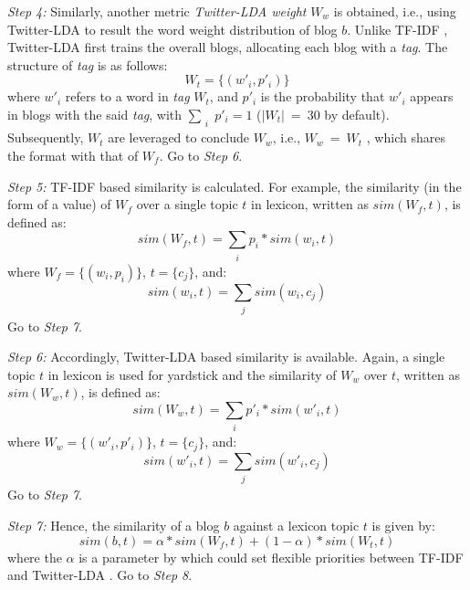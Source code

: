 \textit{Step 4:} Similarly, another metric \textit{Twitter-LDA weight} $W_w$ is obtained, i.e., using Twitter-LDA  to result the word weight distribution of blog $b$.
Unlike TF-IDF , Twitter-LDA  first trains the overall blogs, allocating each blog with a \textit{tag}.
%
The structure of \textit{tag} is as follows:
\begin{equation}
\label{eq:tw-tag}
W_t = \{(w'_i, p'_i)\}
\end{equation}
where $w'_i$ refers to a word in \textit{tag} $W_t$, and $p'_i$ is the probability that $w'_i$ appears in blogs with the said \textit{tag}, with $\sum_{\substack{i}} p'_i = 1$ ($|W_t|\ =\ 30$ by default).
%
Subsequently, $W_t$ are leveraged to conclude $W_w$, i.e., $W_w\ =\ W_t$ , which shares the format with that of $W_f$.
Go to \textit{Step 6}.

\textit{Step 5:} TF-IDF  based similarity is calculated.
For example, the similarity (in the form of a value) of $W_f$ over a single topic $t$ in lexicon, written as $sim(W_f, t)$, is defined as:
\begin{equation}
\label{eq:sim-tf1}
sim(W_f, t) = \sum_{\substack{i}} p_i*sim(w_i, t)
\end{equation}
where $W_f = \{(w_i, p_i)\}$, $t = \{c_j\}$, and:
\begin{equation}
\label{eq:sim-tf2}
sim(w_i, t) = \sum_{\substack{j}} sim(w_i, c_j)
\end{equation}
Go to \textit{Step 7}.


\textit{Step 6:} Accordingly, Twitter-LDA  based similarity is available.
Again, a single topic $t$ in lexicon is used for yardstick and the similarity of $W_w$ over $t$, written as $sim(W_w, t)$, is defined as:
\begin{equation}
\label{eq:sim-tw1}
sim(W_w, t) = \sum_{\substack{i}} p'_i*sim(w'_i, t)
\end{equation}
where $W_w = \{(w'_i, p'_i)\}$, $t = \{c_j\}$, and:
\begin{equation}
\label{eq:sim-tw2}
sim(w'_i, t) = \sum_{\substack{j}} sim(w'_i, c_j)
\end{equation}
Go to \textit{Step 7}.


\textit{Step 7:} Hence, the similarity of a blog $b$ against a lexicon topic $t$ is given by:
\begin{equation}
\label{eq:simbt}
sim(b, t) = \alpha * sim(W_f, t) + (1 - \alpha) * sim(W_t, t)
\end{equation}
where the $\alpha$ is a parameter by which \sys{} could set flexible priorities between TF-IDF  and Twitter-LDA .
Go to \textit{Step 8}.

